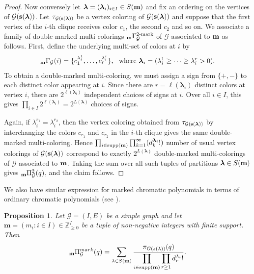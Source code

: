 \documentclass[11pt,reqno]{amsart}
\numberwithin{equation}{section} %
\newtheorem{prop}{Proposition}
\theoremstyle{definition}
\theoremstyle{remark}
\newcommand{\supp}{\operatorname{supp}}
\numberwithin{equation}{section}
\begin{document}
\begin{proof}
Now conversely let $\boldsymbol{\lambda} = (\boldsymbol{\lambda}_i)_{i\in I}\in S(\bold m)$ and fix an ordering on the vertices of $\mathcal{G}(\bold s(\boldsymbol{\lambda}))$. Let ${\tau}_{\mathcal{G}(\bold s(\boldsymbol{\lambda}))}$ be a vertex coloring of $\mathcal{G}(\bold s(\boldsymbol{\lambda}))$ and suppose that the first vertex of the $i$-th clique receives color $c_1$, the second $c_2$ and so on.
We associate a family of double-marked multi-colorings ${_{\bold{m}}\Gamma^{2\text{-mark}}_\mathcal{G}}$ of $\mathcal{G}$ associated to $\bold{m}$ as follows. First, define the underlying multi-set of colors at $i$ by 
$${_{\bold{m}}\Gamma_{\mathcal{G}}}(i)=\{c_1^{\lambda^1_i},\dots,c_r^{\lambda^r_i}\},\ \text{ where $\boldsymbol{\lambda}_i=(\lambda^1_i\ge \cdots \ge \lambda^r_i>0)$}.$$
To obtain a double-marked multi-coloring, we must assign a sign from $\{+,-\}$ to each distinct color appearing at $i$. Since there are $r=\ell(\boldsymbol{\lambda}_i)$ distinct colors at vertex $i$, there are $2^{\ell(\boldsymbol{\lambda}_i)}$ independent choices of signs at $i$. Over all $i\in I$, this gives $\prod_{i\in I} 2^{\ell(\boldsymbol{\lambda}_i)} = 2^{L(\boldsymbol{\lambda})}$ choices of signs.

Again, if $\lambda_{i}^{r_1}=\lambda_{i}^{r_2}$, then the vertex coloring obtained from ${\tau}_{\mathcal{G}(\bold s(\boldsymbol{\lambda}))}$ by interchanging the colors $c_{r_1}$ and $c_{r_2}$ in the $i$-th clique gives the same double-marked multi-coloring. Hence $\prod_{i\in \mathrm{supp}(\bold m)}\prod_{k=1}^{\infty}(d^{\boldsymbol{\lambda}_i}_{k}!)$ number of usual vertex colorings of $\mathcal{G}(\bold s(\boldsymbol{\lambda}))$ correspond to exactly $2^{L(\boldsymbol{\lambda})}$ double-marked multi-colorings of $\mathcal{G}$ associated to $\bold{m}$. Taking the sum over all such tuples of partitions $\boldsymbol{\lambda}\in S(\bold m)$ gives ${_{\bold{m}}\Pi^{2}_\mathcal{G}}(q)$, and the claim follows.


\end{proof}

We also have similar expression for marked chromatic polynomials in terms of ordinary chromatic polynomials (see \cite[Proposition 3.3]{CDV}).
\begin{prop}
Let \(\mathcal G=(I,E)\) be a simple graph and let $\mathbf m=(m_i:i\in I)\in\mathbb{Z}_{\ge0}^{I}$ be a tuple of non-negative integers with finite support. Then
\[
{_\bold m}\Pi_\mathcal G^{mark}(q)
=
\sum_{\lambda\in S(\mathbf m)}
\frac{
\pi_{G(s(\lambda))}(q)
}{
\displaystyle
\prod_{i\in\supp(\mathbf m)}
\prod_{r\ge1} d_r^{\lambda_i}!
}.
\]

\end{prop}
\end{document}
